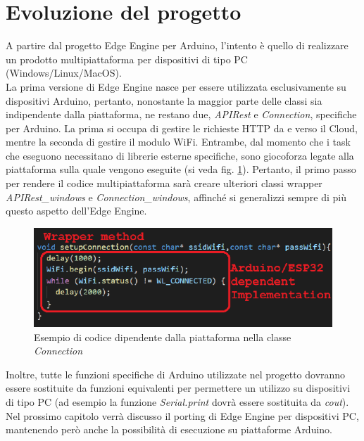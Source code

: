 \section{Evoluzione del progetto}
A partire dal progetto Edge Engine per Arduino, l’intento è quello di realizzare un prodotto multipiattaforma per dispositivi di tipo PC (Windows/Linux/MacOS).\\
La prima versione di Edge Engine nasce per essere utilizzata esclusivamente su dispositivi Arduino, pertanto, nonostante la maggior parte delle classi sia indipendente dalla piattaforma, ne restano due, \textit{APIRest} e \textit{Connection}, specifiche per Arduino. La prima si occupa di gestire le richieste HTTP da e verso il Cloud, mentre la seconda di gestire il modulo WiFi. Entrambe, dal momento che i task che eseguono necessitano di librerie esterne specifiche, sono giocoforza legate alla piattaforma sulla quale vengono eseguite (si veda fig. \ref{arduinodep}). Pertanto, il primo passo per rendere il codice multipiattaforma sarà creare ulteriori classi wrapper \textit{APIRest\_windows} e \textit{Connection\_windows}, affinché si generalizzi sempre di più questo aspetto dell'Edge Engine.\\
\begin{figure}[H]
	\centering
	\includegraphics{pics/arduinodependent}
	\caption{Esempio di codice dipendente dalla piattaforma nella classe \textit{Connection}}
	\label{arduinodep}
\end{figure}
Inoltre, tutte le funzioni specifiche di Arduino utilizzate nel progetto dovranno essere sostituite da funzioni equivalenti per permettere un utilizzo su dispositivi di tipo PC (ad esempio la funzione \textit{Serial.print} dovrà essere sostituita da \textit{cout}).\\
Nel prossimo capitolo verrà discusso il porting di Edge Engine per dispositivi PC, mantenendo però anche la possibilità di esecuzione su piattaforme Arduino.

